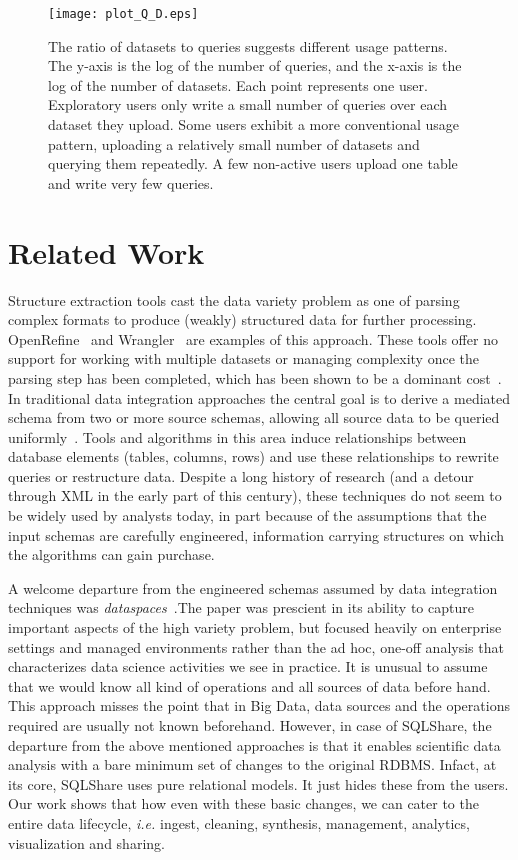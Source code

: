 \documentclass{sig-alternate}
\newcommand{\ie}{{\em i.e.}\xspace}
\newcommand{\sqlshare}{SQLShare}
\begin{document}
\begin{figure}[h]
\centering
\texttt{[image: plot\_Q\_D.eps]}
\vspace{-10pt}
\caption{The ratio of datasets to queries suggests different usage patterns. The y-axis is the log of the number of queries, and the x-axis is the log of the number of datasets. Each point represents one user.  Exploratory users only write a small number of queries over each dataset they upload. Some users exhibit a more conventional usage pattern, uploading a relatively small number of datasets and querying them repeatedly. A few non-active users upload one table and write very few queries.}
\label{fig:qd}
\vspace{-5pt}
\end{figure}

\section{Related Work}
\label{sec:relatedwork}

Structure extraction tools cast the data variety problem as one of parsing complex formats to produce (weakly) structured data for further processing. OpenRefine~\cite{refine} and Wrangler~\cite{kandel2011wrangler} are examples of this approach. These tools offer no support for working with multiple datasets or managing complexity once the parsing step has been completed, which has been shown to be a dominant cost~\cite{analysis-interviews}. 
In traditional data integration approaches the central goal is to derive a mediated schema from two or more source schemas, allowing all source data to be queried uniformly~\cite{doan2005semantic}.
Tools and algorithms in this area induce relationships between database elements (tables, columns, rows) and use these relationships to rewrite queries or restructure data. Despite a long history of research (and a detour through XML in the early part of this century), these techniques do not seem to be widely used by analysts today, in part because of the assumptions that the input schemas are carefully engineered, information carrying structures on which the algorithms can gain purchase. 

A welcome departure from the engineered schemas assumed by data integration techniques was \emph{dataspaces}~\cite{franklin2005databases}.The paper was prescient in its ability to capture important aspects of the high variety problem, but focused heavily on enterprise settings and managed environments rather than the ad hoc, one-off analysis that characterizes data science activities we see in practice. It is unusual to assume that we would know all kind of operations and all sources of data before hand. This approach misses the point that in Big Data, data sources and the operations required are usually not known beforehand. 
However, in case of \sqlshare{}, the departure from the above mentioned approaches is that it
enables scientific data analysis with a bare minimum set of changes to the original RDBMS.
Infact, at its core, \sqlshare{} uses pure relational models. It just hides these from the users.
Our work shows that how even with these basic changes, we can cater to the entire data lifecycle, \ie ingest, cleaning, synthesis, management, analytics, visualization and sharing. 
\end{document}
